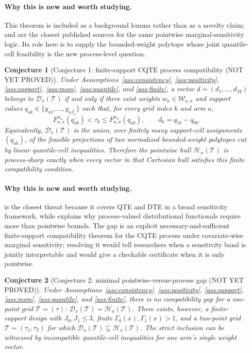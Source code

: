 \documentclass[11pt]{article}
\theoremstyle{definition}
\theoremstyle{plain}
\newtheorem{conjecture}{Conjecture}
\theoremstyle{remark}
\begin{document}
\paragraph{Why this is new and worth studying.}
This theorem is included as a background lemma rather than as a novelty claim; \citet{DornGuo2023} and \citet{MastenPoirierRen2025} are the closest published sources for the same pointwise marginal-sensitivity logic.  Its role here is to supply the bounded-weight polytope whose joint quantile-cell feasibility is the new process-level question.

\begin{conjecture}[Conjecture 1: finite-support CQTE process compatibility (NOT YET PROVED)]\label{conj:process-compatibility}
Under Assumptions~\ref{ass:consistency}, \ref{ass:positivity}, \ref{ass:support}, \ref{ass:msm}, \ref{ass:quantile}, and \ref{ass:finite}, a vector \(d=(d_1,\ldots,d_M)\) belongs to \(\mathcal{D}_x(\mathcal{T})\) if and only if there exist weights \(w_a\in\mathcal{W}_{a,x}\) and support values \(q_{ak}\in\{y_{a1},\ldots,y_{aJ_a}\}\) such that, for every grid index \(k\) and arm \(a\),
\[
F^{w_a}_{a,x}(q_{ak}^-)<\tau_k\le F^{w_a}_{a,x}(q_{ak}),
\qquad
d_k=q_{1k}-q_{0k}.
\]
Equivalently, \(\mathcal{D}_x(\mathcal{T})\) is the union, over finitely many support-cell assignments \((q_{ak})\), of the feasible projections of two normalized bounded-weight polytopes cut by linear quantile-cell inequalities.  Therefore the pointwise hull \(\mathcal{H}_x(\mathcal{T})\) is process-sharp exactly when every vector in that Cartesian hull satisfies this finite compatibility condition.
\end{conjecture}
\paragraph{Why this is new and worth studying.}
\citet{MastenPoirierRen2025} is the closest threat because it covers QTE and DTE in a broad sensitivity framework, while \citet{FirpoRidder2019} explains why process-valued distributional functionals require more than pointwise bounds.  The gap is an explicit necessary-and-sufficient finite-support compatibility theorem for the CQTE process under covariate-wise marginal sensitivity; resolving it would tell researchers when a sensitivity band is jointly interpretable and would give a checkable certificate when it is only pointwise.

\begin{conjecture}[Conjecture 2: minimal pointwise-versus-process gap (NOT YET PROVED)]\label{conj:minimal-gap}
Under Assumptions~\ref{ass:consistency}, \ref{ass:positivity}, \ref{ass:support}, \ref{ass:msm}, \ref{ass:quantile}, and \ref{ass:finite}, there is no compatibility gap for a one-point grid \(\mathcal{T}=(\tau)\): \(\mathcal{D}_x(\mathcal{T})=\mathcal{H}_x(\mathcal{T})\).  There exists, however, a finite-support design with \(J_0,J_1\le 3\), finite \(\Gamma_0(x),\Gamma_1(x)>1\), and a two-point grid \(\mathcal{T}=(\tau_1,\tau_2)\) for which \(\mathcal{D}_x(\mathcal{T})\subsetneq\mathcal{H}_x(\mathcal{T})\).  The strict inclusion can be witnessed by incompatible quantile-cell inequalities for one arm's single weight vector.
\end{conjecture}
\end{document}
